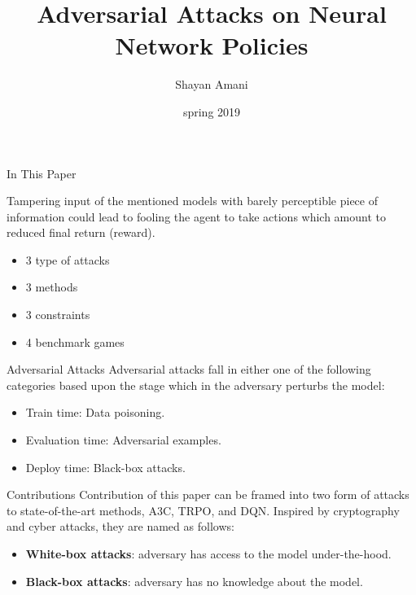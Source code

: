 \documentclass{beamer}
\title{Adversarial Attacks on Neural Network Policies}
\author{Shayan Amani\\}
\date{spring 2019}
\institute{RLRL Weekly Group Meeting}
\begin{document}
  \begin{frame}
    \titlepage
  \end{frame}
  
\begin{frame}{In This Paper}

Tampering input of the mentioned models with barely perceptible piece of information could lead to fooling the agent to take actions which amount to reduced final return (reward).

\begin{itemize} 
    \item 3 type of attacks
    \item 3 methods
    \item 3 constraints
    \item 4 benchmark games
\end{itemize}
    
\end{frame}
 
\begin{frame}{Adversarial Attacks}
Adversarial attacks fall in either one of the following categories based upon the stage which in the adversary perturbs the model:
\begin{itemize}
    \item Train time: Data poisoning.
    \item Evaluation time: Adversarial examples.
    \item Deploy time: Black-box attacks.
\end{itemize}
    
\end{frame}

\begin{frame}{Contributions}
Contribution of this paper can be framed into two form of attacks to state-of-the-art methods, A3C, TRPO, and DQN. Inspired by cryptography and cyber attacks, they are named as follows:
\begin{itemize}
    \item \textbf{White-box attacks}: adversary has access to the model under-the-hood.
    \item \textbf{Black-box attacks}: adversary has no knowledge about the model.
\end{itemize}

\end{frame}
\end{document}
